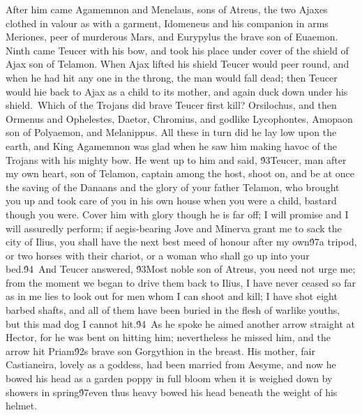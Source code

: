 {After him came Agamemnon and Menelaus, sons of Atreus, the two Ajaxes clothed in valour as with a garment, Idomeneus and his companion in arms Meriones, peer of murderous Mars, and Eurypylus the brave son of Euaemon. Ninth came Teucer with his bow, and took his place under cover of the shield of Ajax son of Telamon. When Ajax lifted his shield Teucer would peer round, and when he had hit any one in the throng, the man would fall dead; then Teucer would hie back to Ajax as a child to its mother, and again duck down under his shield.\
Which of the Trojans did brave Teucer first kill? Orsilochus, and then Ormenus and Ophelestes, Daetor, Chromius, and godlike Lycophontes, Amopaon son of Polyaemon, and Melanippus. All these in turn did he lay low upon the earth, and King Agamemnon was glad when he saw him making havoc of the Trojans with his mighty bow. He went up to him and said, \'93Teucer, man after my own heart, son of Telamon, captain among the host, shoot on, and be at once the saving of the Danaans and the glory of your father Telamon, who brought you up and took care of you in his own house when you were a child, bastard though you were. Cover him with glory though he is far off; I will promise and I will assuredly perform; if aegis-bearing Jove and Minerva grant me to sack the city of Ilius, you shall have the next best meed of honour after my own\'97a tripod, or two horses with their chariot, or a woman who shall go up into your bed.\'94\
And Teucer answered, \'93Most noble son of Atreus, you need not urge me; from the moment we began to drive them back to Ilius, I have never ceased so far as in me lies to look out for men whom I can shoot and kill; I have shot eight barbed shafts, and all of them have been buried in the flesh of warlike youths, but this mad dog I cannot hit.\'94\
As he spoke he aimed another arrow straight at Hector, for he was bent on hitting him; nevertheless he missed him, and the arrow hit Priam\'92s brave son Gorgythion in the breast. His mother, fair Castianeira, lovely as a goddess, had been married from Aesyme, and now he bowed his head as a garden poppy in full bloom when it is weighed down by showers in spring\'97even thus heavy bowed his head beneath the weight of his helmet.\
}
